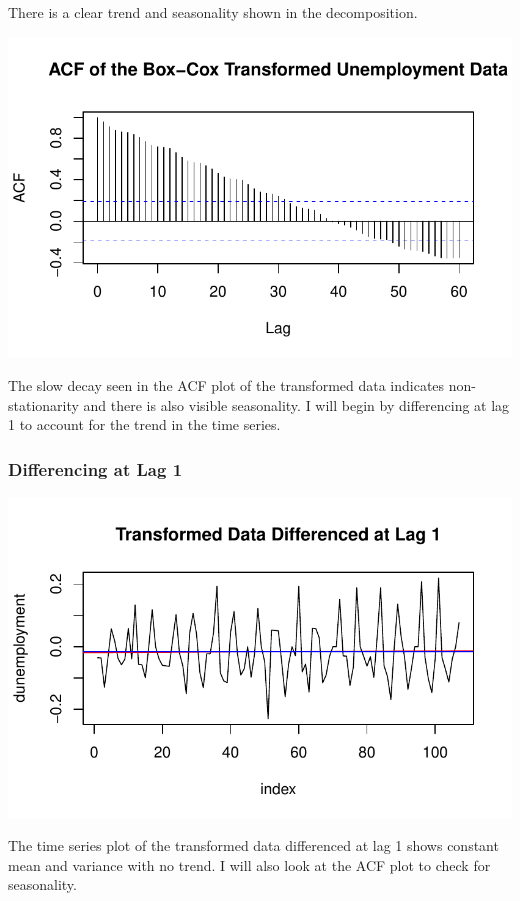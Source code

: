 \documentclass[
  letterpaper,
  DIV=11,
  numbers=noendperiod]{scrartcl}
\begin{document}
There is a clear trend and seasonality shown in the decomposition.

\includegraphics{Final_Project_files/figure-pdf/unnamed-chunk-10-1.pdf}

The slow decay seen in the ACF plot of the transformed data indicates
non-stationarity and there is also visible seasonality. I will begin by
differencing at lag 1 to account for the trend in the time series.

\hypertarget{differencing-at-lag-1}{%
\subsubsection{Differencing at Lag 1}\label{differencing-at-lag-1}}

\includegraphics{Final_Project_files/figure-pdf/unnamed-chunk-11-1.pdf}

The time series plot of the transformed data differenced at lag 1 shows
constant mean and variance with no trend. I will also look at the ACF
plot to check for seasonality.
\end{document}
